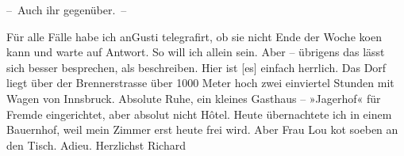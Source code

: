 \pstart
           – Auch ihr gegenüber. –\pend
           
\pstart
           Für alle Fälle habe ich \introOben{}an\introOben{}{ }Gusti telegrafirt, ob sie nicht
               Ende der Woche ko{\geminationm}en kann und warte auf Antwort. So will
               ich allein sein. Aber – übrigens das lässt sich besser besprechen, als beschreiben.
               Hier ist {\pb}{[}es{]} einfach herrlich. Das Dorf liegt über der Brennerstrasse über 1000 Meter hoch zwei einviertel Stunden mit
               Wagen von Innsbruck. Absolute Ruhe, ein kleines
               Gasthaus – »Jagerhof« für Fremde eingerichtet,
               aber absolut nicht Hôtel. Heute übernachtete ich in einem Bauernhof, weil mein Zimmer
               erst heute frei wird. Aber Frau Lou ko{\geminationm}t soeben an den Tisch. Adieu.\pend
           \pstart Herzlichst \spacefill\mbox{Richard}\pend{}\endnumbering{}  \newcommand{\dateiname}{L00480}\newcommand{\titel}{Richard Beer-Hofmann an Arthur Schnitzler, 10. 9. 1895}\newcommand{\editorInnen}{Martin Anton Müller und Gerd-Hermann Susen}

